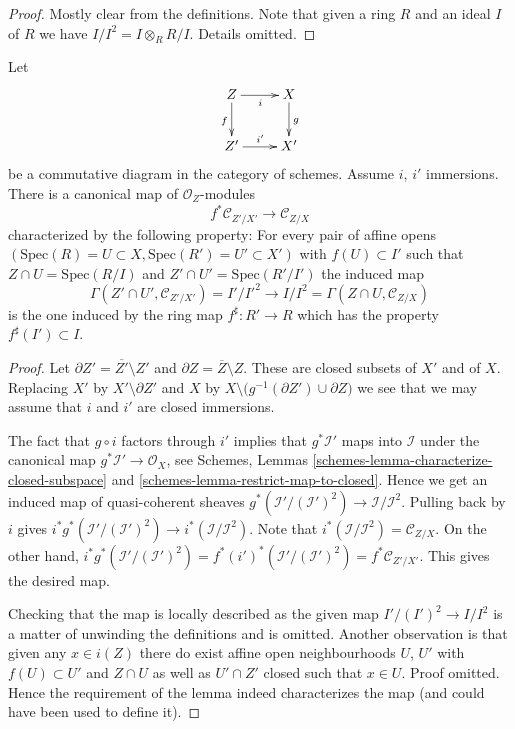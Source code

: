 \begin{proof}
Mostly clear from the definitions. Note that given a ring $R$ and
an ideal $I$ of $R$ we have $I/I^2 = I \otimes_R R/I$. Details omitted.
\end{proof}

\begin{lemma}
\label{lemma-conormal-functorial}
Let
$$
\xymatrix{
Z \ar[r]_i \ar[d]_f & X \ar[d]^g \\
Z' \ar[r]^{i'} & X'
}
$$
be a commutative diagram in the category of schemes.
Assume $i$, $i'$ immersions. There is a canonical map
of $\mathcal{O}_Z$-modules
$$
f^*\mathcal{C}_{Z'/X'}
\longrightarrow
\mathcal{C}_{Z/X}
$$
characterized by the following property: For every pair of affine opens
$(\text{Spec}(R) = U \subset X, \text{Spec}(R') = U' \subset X')$ with
$f(U) \subset I'$ such that
$Z \cap U = \text{Spec}(R/I)$ and $Z' \cap U' = \text{Spec}(R'/I')$
the induced map
$$
\Gamma(Z' \cap U', \mathcal{C}_{Z'/X'}) = I'/I'^2
\longrightarrow
I/I^2 = \Gamma(Z \cap U, \mathcal{C}_{Z/X})
$$
is the one induced by the ring map $f^\sharp : R' \to R$ which
has the property $f^\sharp(I') \subset I$.
\end{lemma}

\begin{proof}
Let $\partial Z' = \overline{Z'} \setminus Z'$ and
$\partial Z = \overline{Z} \setminus Z$. These are closed subsets of $X'$ and
of $X$. Replacing $X'$ by $X' \setminus \partial Z'$ and $X$ by
$X \setminus \big(g^{-1}(\partial Z') \cup \partial Z\big)$ we
see that we may assume that $i$ and $i'$ are closed immersions.

\medskip\noindent
The fact that $g \circ i$ factors through $i'$ implies that
$g^*\mathcal{I}'$ maps into $\mathcal{I}$ under the canonical
map $g^*\mathcal{I}' \to \mathcal{O}_X$, see
Schemes, Lemmas
\ref{schemes-lemma-characterize-closed-subspace} and
\ref{schemes-lemma-restrict-map-to-closed}.
Hence we get an induced map of quasi-coherent sheaves
$g^*(\mathcal{I}'/(\mathcal{I}')^2) \to \mathcal{I}/\mathcal{I}^2$.
Pulling back by $i$ gives
$i^*g^*(\mathcal{I}'/(\mathcal{I}')^2) \to i^*(\mathcal{I}/\mathcal{I}^2)$.
Note that $i^*(\mathcal{I}/\mathcal{I}^2) = \mathcal{C}_{Z/X}$.
On the other hand,
$i^*g^*(\mathcal{I}'/(\mathcal{I}')^2) =
f^*(i')^*(\mathcal{I}'/(\mathcal{I}')^2) = f^*\mathcal{C}_{Z'/X'}$.
This gives the desired map.

\medskip\noindent
Checking that the map is locally described as the given map
$I'/(I')^2 \to I/I^2$ is a matter of unwinding the definitions
and is omitted. Another observation is that given any
$x \in i(Z)$ there do exist affine open neighbourhoods $U$, $U'$
with $f(U) \subset U'$ and $Z \cap U$ as well as $U' \cap Z'$
closed such that $x \in U$. Proof omitted. Hence the requirement
of the lemma indeed characterizes the map (and could have been used
to define it).
\end{proof}






